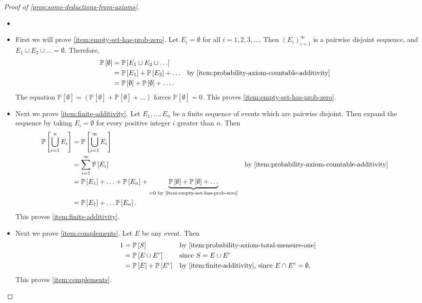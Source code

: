 \documentclass[10pt]{article}
\theoremstyle{definition}
\newcommand{\1}[1]{\textbf{1}_{\left[#1\right]}} %
\def\P{\mathbb{P}} %
\begin{document}
\begin{proof}[Proof of \cref{prop:some-deductions-from-axioms}]
  \begin{itemize}
    \item[] 
    \item First we will prove \ref{item:empty-set-has-prob-zero}. Let
    $E_{i}=\emptyset$ for all $i=1,2,3,...$. Then $(E_{i})_{i=1}^{\infty}$ is
    a pairwise disjoint sequence, and $E_{1}\cup E_{2}\cup\ldots = \emptyset$.
    Therefore,
    \begin{align*}
      \P\left[\emptyset \right] 
      &= \P\left[E_{1}\cup E_{2}\cup\ldots \right]\\
      &= \P\left[E_{1} \right]+ \P\left[E_{2} \right]+\ldots
      &&\text{by \ref{item:probability-axiom-countable-additivity} }\\
      &= \P\left[\emptyset \right]+ \P\left[\emptyset \right]+\ldots.
    \end{align*}
    The equation $\P\left[\emptyset \right] = (\P\left[\emptyset \right]+ \P\left[\emptyset \right]+\ldots)$
    forces $\P\left[\emptyset \right] = 0$. This proves
    \ref{item:empty-set-has-prob-zero}.

    \item Next we prove \ref{item:finite-additivity}. Let $E_{1},\ldots,E_{n}$
    be a finite sequence of events which are pairwise disjoint. Then expand
    the sequence by taking $E_{i} = \emptyset$ for every positive integer $i$
    greater than $n$. Then
    \begin{align*}
      \P\left[\bigcup_{i=1}^{n}E_{i} \right]
      &= \P\left[\bigcup_{i=1}^{\infty}E_{i} \right]\\
      &= \sum_{i=1}^{\infty} \P\left[E_{i} \right] &&\text{by \ref{item:probability-axiom-countable-additivity} } \\
      &= \P\left[E_{1} \right] + \ldots + \P\left[E_{n} \right] +
        \underbrace{\P\left[\emptyset \right] + \P\left[\emptyset \right]+\ldots}
        _{=0\text{ by \ref{item:empty-set-has-prob-zero}}}\\
      &=\P\left[E_{1} \right] + \ldots \P\left[E_{n} \right].
    \end{align*}
    This proves \ref{item:finite-additivity}.

    \item   Next we prove \ref{item:complements}. Let $E$ be any event. Then
    \begin{align*}
      1 
      &= \P\left[S \right]  &&\text{by \ref{item:probability-axiom-total-measure-one} }\\
      &= \P\left[ E\cup E^{c}\right] &&\text{since }S = E\cup E^{c}\\
      &= \P\left[E \right]+ \P\left[E^{c} \right]
                            &&\text{by
                               \ref{item:finite-additivity},
                               since $E\cap E^{c}=\emptyset$.}
    \end{align*}
    This proves \ref{item:complements}.
    

\end{itemize}
\end{proof}
\end{document}
